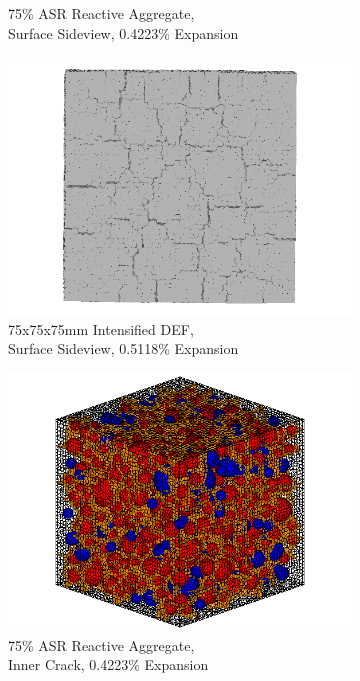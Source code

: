 \begin{figure}[ht]
\begin{subfigure}{.5\textwidth}
      \caption{75\% ASR Reactive Aggregate, \\Surface Sideview, 0.4223\% Expansion}
      \end{subfigure}%
    \begin{subfigure}{.5\textwidth}
      \centering
      \includegraphics[width=.8\linewidth]{Files/exp_3D/DEF/A30X-5C_3_3ds.png}
      \caption{75x75x75mm Intensified DEF, \\ Surface Sideview, 0.5118\% Expansion}
      \end{subfigure}
      \begin{subfigure}{.5\textwidth}
        \centering
        \includegraphics[width=.8\linewidth]{Files/exp_3D/ASR/A30P75_3_c.png}
        \caption{75\% ASR Reactive Aggregate, \\Inner Crack, 0.4223\% Expansion}
        \end{subfigure}%
      \begin{subfigure}{.5\textwidth}
        \centering

\end{subfigure}
\end{figure}
